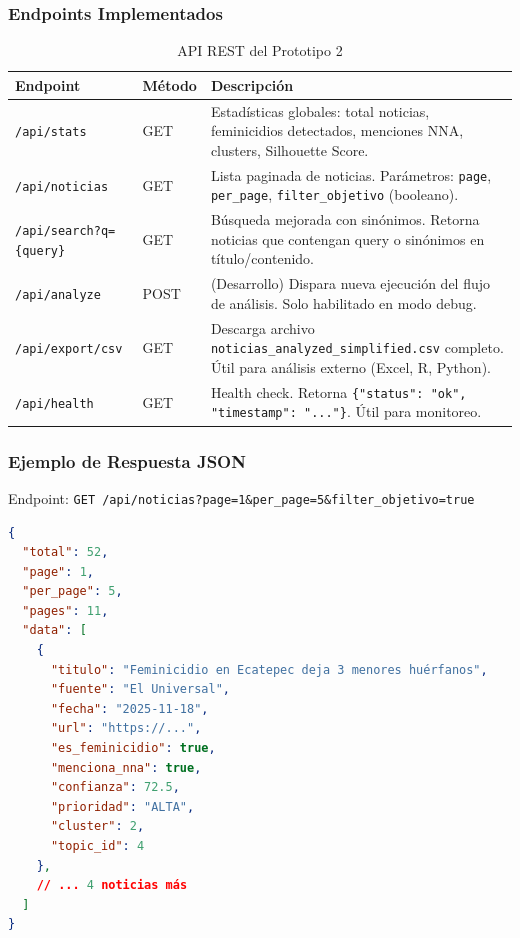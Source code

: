 \subsubsection{Endpoints Implementados}

\begin{table}[h]
\centering
\caption{API REST del Prototipo 2}
\label{table:api_endpoints}
\begin{tabular}{|l|l|p{6cm}|}
\hline
\textbf{Endpoint} & \textbf{Método} & \textbf{Descripción} \\ \hline
\texttt{/api/stats} & GET & Estadísticas globales: total noticias, feminicidios detectados, menciones NNA, clusters, Silhouette Score. \\ \hline
\texttt{/api/noticias} & GET & Lista paginada de noticias. Parámetros: \texttt{page}, \texttt{per\_page}, \texttt{filter\_objetivo} (booleano). \\ \hline
\texttt{/api/search?q=\{query\}} & GET & Búsqueda mejorada con sinónimos. Retorna noticias que contengan query o sinónimos en título/contenido. \\ \hline
\texttt{/api/analyze} & POST & (Desarrollo) Dispara nueva ejecución del flujo de análisis. Solo habilitado en modo debug. \\ \hline
\texttt{/api/export/csv} & GET & Descarga archivo \texttt{noticias\_analyzed\_simplified.csv} completo. Útil para análisis externo (Excel, R, Python). \\ \hline
\texttt{/api/health} & GET & Health check. Retorna \texttt{\{"status": "ok", "timestamp": "..."\}}. Útil para monitoreo. \\ \hline
\end{tabular}
\end{table}

\subsubsection{Ejemplo de Respuesta JSON}

Endpoint: \texttt{GET /api/noticias?page=1\&per\_page=5\&filter\_objetivo=true}

\begin{lstlisting}[language=json, caption={Respuesta típica de /api/noticias}]
{
  "total": 52,
  "page": 1,
  "per_page": 5,
  "pages": 11,
  "data": [
    {
      "titulo": "Feminicidio en Ecatepec deja 3 menores huérfanos",
      "fuente": "El Universal",
      "fecha": "2025-11-18",
      "url": "https://...",
      "es_feminicidio": true,
      "menciona_nna": true,
      "confianza": 72.5,
      "prioridad": "ALTA",
      "cluster": 2,
      "topic_id": 4
    },
    // ... 4 noticias más
  ]
}
\end{lstlisting}

